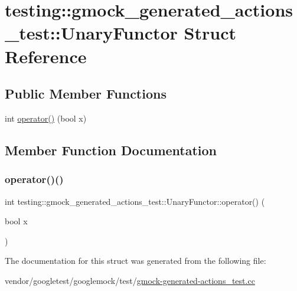 \hypertarget{structtesting_1_1gmock__generated__actions__test_1_1_unary_functor}{}\section{testing\+:\+:gmock\+\_\+generated\+\_\+actions\+\_\+test\+:\+:Unary\+Functor Struct Reference}
\label{structtesting_1_1gmock__generated__actions__test_1_1_unary_functor}
\subsection*{Public Member Functions}
\begin{DoxyCompactItemize}
\item 
int \hyperlink{structtesting_1_1gmock__generated__actions__test_1_1_unary_functor_aeae4c0025faeac92845d652b35ac2846}{operator()} (bool x)
\end{DoxyCompactItemize}


\subsection{Member Function Documentation}
\mbox{\label{structtesting_1_1gmock__generated__actions__test_1_1_unary_functor_aeae4c0025faeac92845d652b35ac2846}} 
\subsubsection{\texorpdfstring{operator()()}{operator()()}}
{\footnotesize\ttfamily int testing\+::gmock\+\_\+generated\+\_\+actions\+\_\+test\+::\+Unary\+Functor\+::operator() (\begin{DoxyParamCaption}\item[{bool}]{x }\end{DoxyParamCaption})\hspace{0.3cm}{\ttfamily [inline]}}



The documentation for this struct was generated from the following file\+:\begin{DoxyCompactItemize}
\item 
vendor/googletest/googlemock/test/\hyperlink{gmock-generated-actions__test_8cc}{gmock-\/generated-\/actions\+\_\+test.\+cc}\end{DoxyCompactItemize}
